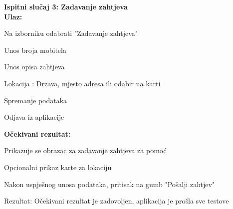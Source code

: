 			\noindent \textbf{Ispitni slučaj 3: Zadavanje zahtjeva}\\
			 \medskip
            \noindent\textbf{Ulaz:}
            \begin{packed_enum}
            \item Na izborniku odabrati "Zadavanje zahtjeva"
            \item Unos broja mobitela
            \item Unos opisa zahtjeva
            \item Lokacija : Drzava, mjesto adresa ili odabir na karti
            \item Spremanje podataka
            \item Odjava iz aplikacije
            \end{packed_enum}
            
            \noindent\textbf{Očekivani rezultat:}
            \begin{packed_enum}
            \item Prikazuje se obrazac za zadavanje zahtjeva za pomoć
            \item Opcionalni prikaz karte za lokaciju
            \item Nakon uspješnog unosa podataka, pritisak na gumb "Pošalji zahtjev"
            \end{packed_enum}
            
            \noindent \text
            Rezultat: Očekivani rezultat je zadovoljen, aplikacija je prošla sve testove \\  
            
